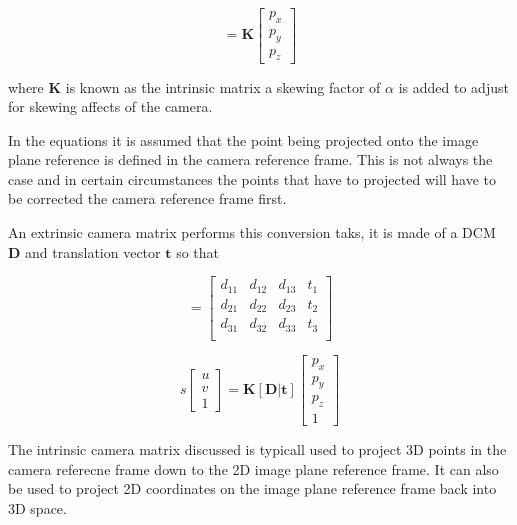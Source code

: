 \begin{equation}
    = \mathbf{K}
    \begin{bmatrix}
    p_x \\
    p_y \\
    p_z
    \end{bmatrix}
\end{equation}

where $\mathbf{K}$ is known as the intrinsic matrix a skewing factor of $\alpha$ is added to adjust for skewing affects of the camera.


In the equations it is assumed that the point being projected onto the image plane reference is defined in the camera reference frame. This
is not always the case and in certain circumstances the points that have to projected will have to be corrected the camera reference frame first.

An extrinsic camera matrix performs this conversion taks, it is made of a DCM $\mathbf{D}$ and translation vector $\mathbf{t}$ so that 

\begin{equation}
    [\mathbf{D}|\mathbf{t}] =
    \begin{bmatrix}
        d_{11} & d_{12} & d_{13} & t_1 \\
        d_{21} & d_{22} & d_{23} & t_2 \\
        d_{31} & d_{32} & d_{33} & t_3 \\
    \end{bmatrix}
\end{equation}

\begin{equation}
    s
    \begin{bmatrix}
        u \\
        v \\
        1
    \end{bmatrix}
    = \mathbf{K}[\mathbf{D}|\mathbf{t}]
    \begin{bmatrix}
        p_x \\
        p_y \\
        p_z \\
        1
    \end{bmatrix}
\end{equation}


The intrinsic camera matrix discussed is typicall used to project 3D points in the camera referecne frame down to the 2D image plane reference frame. It can
also be used to project 2D coordinates on the image plane reference frame back into 3D space.

